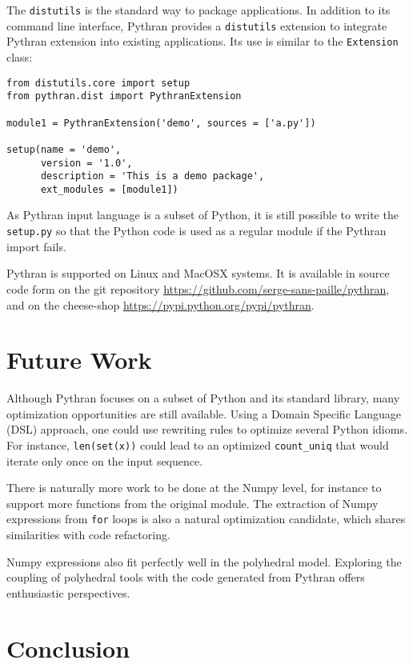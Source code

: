 \documentclass[10pt, onecolumn, preprint]{sigplanconf}
\begin{document}
The \texttt{distutils} is the standard way to package applications. In addition
to its command line interface, Pythran provides a \texttt{distutils} extension
to integrate Pythran extension into existing applications. Its use is similar
to the \texttt{Extension} class:

\begin{lstlisting}
from distutils.core import setup
from pythran.dist import PythranExtension

module1 = PythranExtension('demo', sources = ['a.py'])

setup(name = 'demo',
      version = '1.0',
      description = 'This is a demo package',
      ext_modules = [module1])
\end{lstlisting}

As Pythran input language is a subset of Python, it is still possible to write
the \texttt{setup.py} so that the Python code is used as a regular module if
the Pythran import fails.

Pythran is supported on Linux and MacOSX systems.  It is available in source
code form on the git repository
\url{https://github.com/serge-sans-paille/pythran}, and on the cheese-shop
\url{https://pypi.python.org/pypi/pythran}.


\section{Future Work}

Although Pythran focuses on a subset of Python and its standard library, many
optimization opportunities are still available. Using a Domain Specific
Language (DSL) approach, one could use rewriting rules to optimize several
Python idioms. For instance, \texttt{len(set(x))} could lead to an optimized
\texttt{count\_uniq} that would iterate only once on the input sequence.

There is naturally more work to be done at the Numpy level, for instance to
support more functions from the original module. The extraction of Numpy
expressions from \texttt{for} loops is also a natural optimization candidate, which
shares similarities with code refactoring.

Numpy expressions also fit perfectly well in the polyhedral model. Exploring
the coupling of polyhedral tools with the code generated from Pythran offers
enthusiastic perspectives.

\section{Conclusion}
\end{document}
